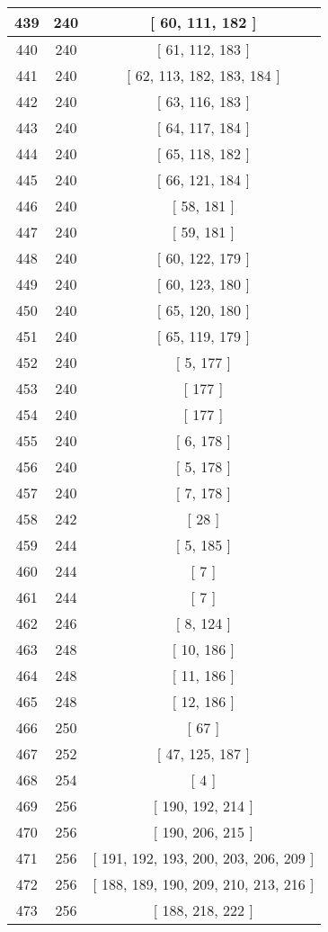\begin{center}
\begin{longtable}[H]{|| c c c ||}
439 & 240 & [ 60, 111, 182 ]
\\\hline
440 & 240 & [ 61, 112, 183 ]
\\\hline
441 & 240 & [ 62, 113, 182, 183, 184 ]
\\\hline
442 & 240 & [ 63, 116, 183 ]
\\\hline
443 & 240 & [ 64, 117, 184 ]
\\\hline
444 & 240 & [ 65, 118, 182 ]
\\\hline
445 & 240 & [ 66, 121, 184 ]
\\\hline
446 & 240 & [ 58, 181 ]
\\\hline
447 & 240 & [ 59, 181 ]
\\\hline
448 & 240 & [ 60, 122, 179 ]
\\\hline
449 & 240 & [ 60, 123, 180 ]
\\\hline
450 & 240 & [ 65, 120, 180 ]
\\\hline
451 & 240 & [ 65, 119, 179 ]
\\\hline
452 & 240 & [ 5, 177 ]
\\\hline
453 & 240 & [ 177 ]
\\\hline
454 & 240 & [ 177 ]
\\\hline
455 & 240 & [ 6, 178 ]
\\\hline
456 & 240 & [ 5, 178 ]
\\\hline
457 & 240 & [ 7, 178 ]
\\\hline
458 & 242 & [ 28 ]
\\\hline
459 & 244 & [ 5, 185 ]
\\\hline
460 & 244 & [ 7 ]
\\\hline
461 & 244 & [ 7 ]
\\\hline
462 & 246 & [ 8, 124 ]
\\\hline
463 & 248 & [ 10, 186 ]
\\\hline
464 & 248 & [ 11, 186 ]
\\\hline
465 & 248 & [ 12, 186 ]
\\\hline
466 & 250 & [ 67 ]
\\\hline
467 & 252 & [ 47, 125, 187 ]
\\\hline
468 & 254 & [ 4 ]
\\\hline
469 & 256 & [ 190, 192, 214 ]
\\\hline
470 & 256 & [ 190, 206, 215 ]
\\\hline
471 & 256 & [ 191, 192, 193, 200, 203, 206, 209 ]
\\\hline
472 & 256 & [ 188, 189, 190, 209, 210, 213, 216 ]
\\\hline
473 & 256 & [ 188, 218, 222 ]

\end{longtable}
\end{center}
